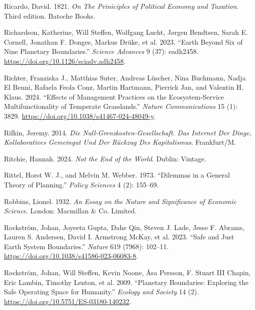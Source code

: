 \documentclass[
  a4paper,
  openany]{book}
\newlength{\cslhangindent}
\newenvironment{CSLReferences}[2] %
 {\begin{list}{}{%
  \setlength{\itemindent}{0pt}
  \setlength{\leftmargin}{0pt}
  \setlength{\parsep}{0pt}
  \ifodd #1
   \setlength{\leftmargin}{\cslhangindent}
   \setlength{\itemindent}{-1\cslhangindent}
  \fi
  \setlength{\itemsep}{#2\baselineskip}}}
 {\end{list}}
\begin{document}
\begin{CSLReferences}{1}{0}
Ricardo, David. 1821. \emph{On {The Priniciples} of {Political Economy}
and {Taxation}}. Third edition. Batoche Books.

Richardson, Katherine, Will Steffen, Wolfgang Lucht, Jørgen Bendtsen,
Sarah E. Cornell, Jonathan F. Donges, Markus Drüke, et al. 2023.
{``Earth Beyond Six of Nine Planetary Boundaries.''} \emph{Science
Advances} 9 (37): eadh2458.
\url{https://doi.org/10.1126/sciadv.adh2458}.

Richter, Franziska J., Matthias Suter, Andreas Lüscher, Nina Buchmann,
Nadja El Benni, Rafaela Feola Conz, Martin Hartmann, Pierrick Jan, and
Valentin H. Klaus. 2024. {``Effects of Management Practices on the
Ecosystem-Service Multifunctionality of Temperate Grasslands.''}
\emph{Nature Communications} 15 (1): 3829.
\url{https://doi.org/10.1038/s41467-024-48049-y}.

Rifkin, Jeremy. 2014. \emph{Die {Null-Grenzkosten-Gesellschaft}. {Das
Internet} Der {Dinge}, Kollaboratives {Gemeingut} Und Der {R{ü}ckzug}
Des {Kapitalismus}}. Frankfurt/M.

Ritchie, Hannah. 2024. \emph{Not the {End} of the {World}}. Dublin:
Vintage.

Rittel, Horst W. J., and Melvin M. Webber. 1973. {``Dilemmas in a
{General Theory} of {Planning}.''} \emph{Policy Sciences} 4 (2):
155--69.

Robbins, Lionel. 1932. \emph{An {Essay} on the {Nature} and
{Significance} of {Economic Science}}. London: Macmillan \& Co. Limited.

Rockström, Johan, Joyeeta Gupta, Dahe Qin, Steven J. Lade, Jesse F.
Abrams, Lauren S. Andersen, David I. Armstrong McKay, et al. 2023.
{``Safe and Just {Earth} System Boundaries.''} \emph{Nature} 619 (7968):
102--11. \url{https://doi.org/10.1038/s41586-023-06083-8}.

Rockström, Johan, Will Steffen, Kevin Noone, Åsa Persson, F. Stuart III
Chapin, Eric Lambin, Timothy Lenton, et al. 2009. {``Planetary
{Boundaries}: {Exploring} the {Safe Operating Space} for {Humanity}.''}
\emph{Ecology and Society} 14 (2).
\url{https://doi.org/10.5751/ES-03180-140232}.


\end{CSLReferences}
\end{document}
